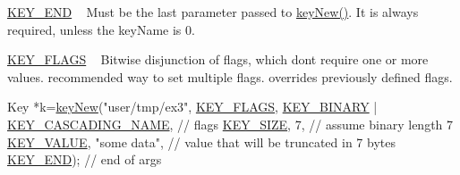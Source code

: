 \begin{DoxyItemize}
\item \hyperlink{group__key_gga91fb3178848bd682000958089abbaf40aa8adb6fcb92dec58fb19410eacfdd403}{K\+E\+Y\+\_\+\+E\+ND} ~\newline
 Must be the last parameter passed to \hyperlink{group__key_gad23c65b44bf48d773759e1f9a4d43b89}{key\+New()}. It is always required, unless the {\ttfamily key\+Name} is 0.
\item \hyperlink{group__key_gga91fb3178848bd682000958089abbaf40a4b83f86a07a7a0d6e24ecafe43cfea1b}{K\+E\+Y\+\_\+\+F\+L\+A\+GS} ~\newline
 Bitwise disjunction of flags, which don\textquotesingle{}t require one or more values. recommended way to set multiple flags. overrides previously defined flags. 
\begin{DoxyCodeInclude}
Key *k=\hyperlink{group__key_gad23c65b44bf48d773759e1f9a4d43b89}{keyNew}(\textcolor{stringliteral}{"user/tmp/ex3"},
        \hyperlink{group__key_gga91fb3178848bd682000958089abbaf40a4b83f86a07a7a0d6e24ecafe43cfea1b}{KEY\_FLAGS}, \hyperlink{group__key_gga91fb3178848bd682000958089abbaf40a1ca18d4e094ae7487d35ecedda2235ff}{KEY\_BINARY} | \hyperlink{group__key_gga91fb3178848bd682000958089abbaf40afc1567f74444ff9c219f7456b652b4ec}{KEY\_CASCADING\_NAME}, \textcolor{comment}{// flags}
        \hyperlink{group__key_gga91fb3178848bd682000958089abbaf40a6d531b5c41445d19d0452eebdccbfa01}{KEY\_SIZE}, 7,                    \textcolor{comment}{// assume binary length 7}
        \hyperlink{group__key_gga91fb3178848bd682000958089abbaf40ac66e4a49d09212b79f5754ca6db5bd2e}{KEY\_VALUE}, \textcolor{stringliteral}{"some data"},                \textcolor{comment}{// value that will be truncated in 7 bytes}
        \hyperlink{group__key_gga91fb3178848bd682000958089abbaf40aa8adb6fcb92dec58fb19410eacfdd403}{KEY\_END});                        \textcolor{comment}{// end of args}
\end{DoxyCodeInclude}


\end{DoxyItemize}
